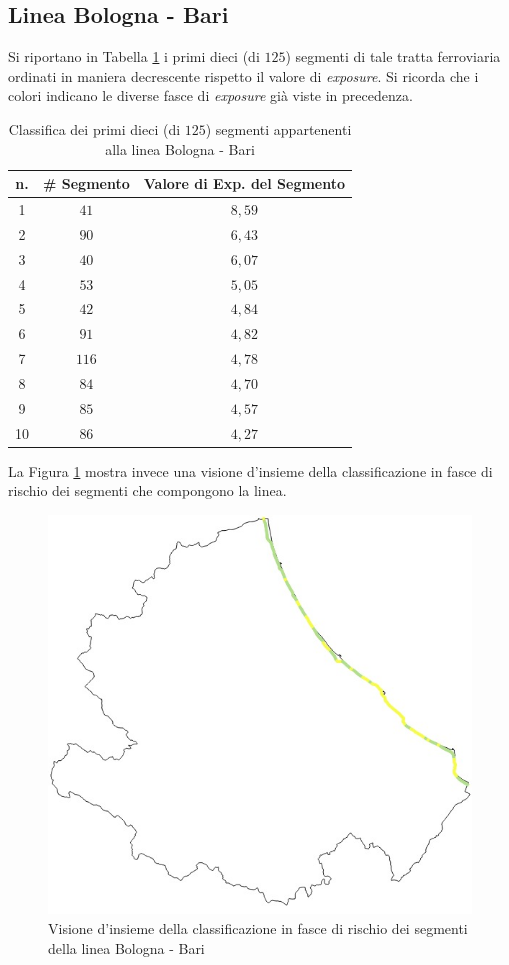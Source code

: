 \subsection{Linea Bologna - Bari}
Si riportano in Tabella \ref{classificabolognabari} i primi dieci (di $125$) segmenti di tale tratta ferroviaria ordinati in maniera decrescente rispetto il valore di \textit{exposure}. Si ricorda che i colori indicano le diverse fasce di \textit{exposure} già viste in precedenza.
\begin{table}[h]
\centering
\begin{tabular}{|c|c|c|}
\hline
\rowcolor{lightgray}
n. & \# Segmento & Valore di Exp. del Segmento \\ \hline \rowcolor{icterine}
1  & $41$        & $8,59$                      \\ \hline \rowcolor{icterine}
2  & $90$        & $6,43$                      \\ \hline \rowcolor{icterine}
3  & $40$        & $6,07$                      \\ \hline \rowcolor{icterine}
4  & $53$        & $5,05$                      \\ \hline \rowcolor{icterine}
5  & $42$        & $4,84$                      \\ \hline \rowcolor{icterine}
6  & $91$        & $4,82$                      \\ \hline \rowcolor{icterine}
7  & $116$       & $4,78$                      \\ \hline \rowcolor{icterine}
8  & $84$        & $4,70$                      \\ \hline \rowcolor{icterine}
9  & $85$        & $4,57$                      \\ \hline \rowcolor{icterine}
10 & $86$        & $4,27$                      \\ \hline
\end{tabular}
\caption{Classifica dei primi dieci (di $125$) segmenti appartenenti alla linea Bologna - Bari}
\label{classificabolognabari}
\end{table}
\newline
La Figura \ref{bolognabari} mostra invece una visione d'insieme della classificazione in fasce di rischio dei segmenti che compongono la linea.
\begin{figure}[h]
\centering
\includegraphics[width=0.4\linewidth]{img/bolognabari.jpeg}
\caption{Visione d'insieme della classificazione in fasce di rischio dei segmenti della linea Bologna - Bari}
\label{bolognabari}
\end{figure}
